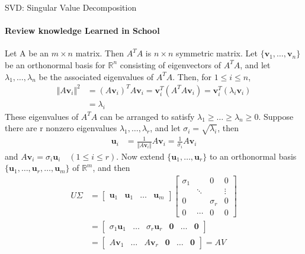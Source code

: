 \documentclass{beamer}
\begin{document}
\begin{frame}{SVD: Singular Value Decomposition}
  \framesubtitle{Review knowledge Learned in School}
  {\tiny
    Let A be an $m{\times}n$ matrix. Then $A^{T}A$ is $n{\times}n$ symmetric matrix. Let $\{\textbf{v}_1,\dots,\textbf{v}_n\}$ be an orthonormal basis for $\mathbb{R}^n$ consisting of eigenvectors of $A^{T}A$, and let $\lambda_1,\dots,\lambda_n$ be the associated eigenvalues of $A^{T}A$.
    Then, for $1 \leq i \leq n$,
    \begin{align*}
      \Vert A \textbf{v}_i \Vert^2 &= (A \textbf{v}_i)^T A \textbf{v}_i = \textbf{v}_i^T (A^T A \textbf{v}_i) = \textbf{v}_i^T (\lambda_i \textbf{v}_i) \\
                                   &= \lambda_i
    \end{align*}
    These eigenvalues of $A^TA$ can be arranged to satisfy $\lambda_1 \geq \dots \geq \lambda_n \geq 0$.
    Suppose there are r nonzero eigenvalues ${\lambda_1,\dots,\lambda_r}$, and let $\sigma_i = \sqrt{\lambda_i}$, then
    \begin{align*}
      \textbf{u}_i &= \frac{1}{\Vert A \textbf{v}_i \Vert} A \textbf{v}_i = \frac{1}{\sigma_i} A \textbf{v}_i
    \end{align*}
    and $A \textbf{v}_i = \sigma_i \textbf{u}_i \quad ( 1 \leq i \leq r)$.
    Now extend $\{\textbf{u}_1,\dots,\textbf{u}_r\}$ to an orthonormal basis $\{\textbf{u}_1,\dots,\textbf{u}_r,\dots,\textbf{u}_m\}$ of $\mathbb{R}^m$, and then
    \begin{align*}
      U\Sigma &=
      \begin{bmatrix} \textbf{u}_1 & \textbf{u}_1 & \dots & \textbf{u}_m \end{bmatrix}
      \begin{bmatrix}
        \sigma_1   &        & 0          & 0      \\
                   & \ddots &            & \vdots \\
        0          &        & \sigma_r   & 0      \\
        0          & \cdots & 0          & 0
      \end{bmatrix} \\
      &= \begin{bmatrix} \sigma_1 \textbf{u}_1 & \dots & \sigma_r \textbf{u}_r & \textbf{0} & \dots & \textbf{0} \end{bmatrix} \\
      &= \begin{bmatrix} A \textbf{v}_1        & \dots & A \textbf{v}_r        & \textbf{0} & \dots & \textbf{0} \end{bmatrix} = AV \\

\end{align*}}
\end{frame}
\end{document}
